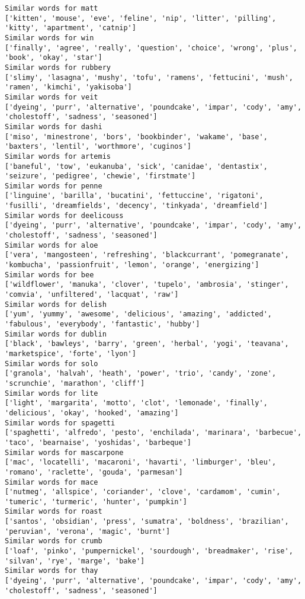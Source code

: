 \documentclass[11pt]{article}
\begin{document}
\begin{Verbatim}[commandchars=\\\{\}]
Similar words for matt
['kitten', 'mouse', 'eve', 'feline', 'nip', 'litter', 'pilling', 'kitty', 'apartment', 'catnip']
Similar words for win
['finally', 'agree', 'really', 'question', 'choice', 'wrong', 'plus', 'book', 'okay', 'star']
Similar words for rubbery
['slimy', 'lasagna', 'mushy', 'tofu', 'ramens', 'fettucini', 'mush', 'ramen', 'kimchi', 'yakisoba']
Similar words for veit
['dyeing', 'purr', 'alternative', 'poundcake', 'impar', 'cody', 'amy', 'cholestoff', 'sadness', 'seasoned']
Similar words for dashi
['miso', 'minestrone', 'bors', 'bookbinder', 'wakame', 'base', 'baxters', 'lentil', 'worthmore', 'cuginos']
Similar words for artemis
['baneful', 'tow', 'eukanuba', 'sick', 'canidae', 'dentastix', 'seizure', 'pedigree', 'chewie', 'firstmate']
Similar words for penne
['linguine', 'barilla', 'bucatini', 'fettuccine', 'rigatoni', 'fusilli', 'dreamfields', 'decency', 'tinkyada', 'dreamfield']
Similar words for deelicouss
['dyeing', 'purr', 'alternative', 'poundcake', 'impar', 'cody', 'amy', 'cholestoff', 'sadness', 'seasoned']
Similar words for aloe
['vera', 'mangosteen', 'refreshing', 'blackcurrant', 'pomegranate', 'kombucha', 'passionfruit', 'lemon', 'orange', 'energizing']
Similar words for bee
['wildflower', 'manuka', 'clover', 'tupelo', 'ambrosia', 'stinger', 'comvia', 'unfiltered', 'lacquat', 'raw']
Similar words for delish
['yum', 'yummy', 'awesome', 'delicious', 'amazing', 'addicted', 'fabulous', 'everybody', 'fantastic', 'hubby']
Similar words for dublin
['black', 'bawleys', 'barry', 'green', 'herbal', 'yogi', 'teavana', 'marketspice', 'forte', 'lyon']
Similar words for solo
['granola', 'halvah', 'heath', 'power', 'trio', 'candy', 'zone', 'scrunchie', 'marathon', 'cliff']
Similar words for lite
['light', 'margarita', 'motto', 'clot', 'lemonade', 'finally', 'delicious', 'okay', 'hooked', 'amazing']
Similar words for spagetti
['spaghetti', 'alfredo', 'pesto', 'enchilada', 'marinara', 'barbecue', 'taco', 'bearnaise', 'yoshidas', 'barbeque']
Similar words for mascarpone
['mac', 'locatelli', 'macaroni', 'havarti', 'limburger', 'bleu', 'romano', 'raclette', 'gouda', 'parmesan']
Similar words for mace
['nutmeg', 'allspice', 'coriander', 'clove', 'cardamom', 'cumin', 'tumeric', 'turmeric', 'hunter', 'pumpkin']
Similar words for roast
['santos', 'obsidian', 'press', 'sumatra', 'boldness', 'brazilian', 'peruvian', 'verona', 'magic', 'burnt']
Similar words for crumb
['loaf', 'pinko', 'pumpernickel', 'sourdough', 'breadmaker', 'rise', 'silvan', 'rye', 'marge', 'bake']
Similar words for thay
['dyeing', 'purr', 'alternative', 'poundcake', 'impar', 'cody', 'amy', 'cholestoff', 'sadness', 'seasoned']

\end{Verbatim}
\end{document}
